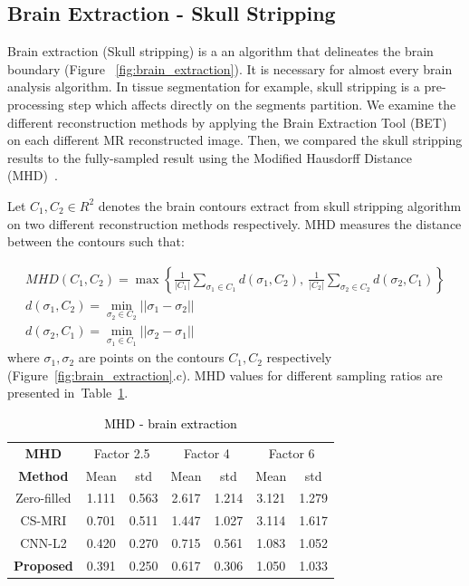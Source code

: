 \documentclass[review]{elsarticle}
\begin{document}
\subsection{Brain Extraction - Skull Stripping}
Brain extraction (Skull stripping) is a an algorithm that delineates the brain boundary (Figure~ \ref{fig:brain_extraction}). It is necessary for almost every brain analysis algorithm. In tissue segmentation for example, skull stripping is a pre-processing step which affects directly on the segments partition. We examine the different reconstruction methods by applying the Brain Extraction Tool (BET) \cite{smith2002fast} on each different MR reconstructed image. Then, we compared the skull stripping results to the fully-sampled result using the Modified Hausdorff Distance (MHD)~\cite{dubuisson1994modified}.

Let $C_1,C_2\in R^2$ denotes the brain contours extract from skull stripping algorithm on two different reconstruction methods respectively. MHD measures the distance between the contours such that:

\begin{equation}
\begin{array}{cc}
MHD(C_1,C_2) = \max \left\{\frac{1}{|C_1|} \sum_{\sigma_{1}\in C_1}^{}d(\sigma_1,C_2), ~ \frac{1}{|C_2|} \sum_{\sigma_{2}\in C_2}^{}d(\sigma_2,C_1)\right\} \\
d(\sigma_1,C_2) = \underset{\sigma_{2}\in C_{2}}{\min}||\sigma_1-\sigma_2|| \\
d(\sigma_2,C_1) = \underset{\sigma_{1}\in C_{1}}{\min}||\sigma_2-\sigma_1||
\end{array}
\end{equation}
where $\sigma_1,\sigma_2$ are points on the contours $C_1,C_2$ respectively (Figure~\ref{fig:brain_extraction}.c). MHD values for different sampling ratios are presented in~Table~\ref{tbl:MHD}.

\begin{table}[H]
	\centering{}
	\begin{tabular}{|c||c|c||c|c||c|c|}
		\hline 
		\textbf{MHD} & \multicolumn{2}{c||}{Factor 2.5} & \multicolumn{2}{c||}{Factor 4} & \multicolumn{2}{c|}{Factor 6}\tabularnewline \cline{2-7}
		
		\textbf{Method}     &Mean   &std    &Mean   &std     &Mean   &std \tabularnewline \hline 	
		Zero-filled         &1.111 &0.563  &2.617 &1.214   &3.121 &1.279\tabularnewline
		CS-MRI              &0.701 &0.511  &1.447 &1.027   &3.114 &1.617\tabularnewline
		CNN-L2              &0.420 &0.270  &0.715 &0.561   &1.083 &1.052\tabularnewline
		\textbf{Proposed}   &0.391 &0.250  &0.617 &0.306   &1.050 &1.033\tabularnewline
		\hline 
	\end{tabular}\caption{\textcolor{black}{\footnotesize{}{}MHD - brain extraction}{\footnotesize{}\label{tbl:MHD}}}
\end{table}
\end{document}

